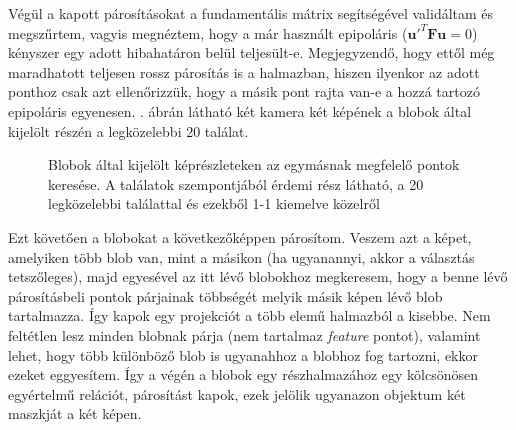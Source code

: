 Végül a kapott párosításokat a fundamentális mátrix segítségével validáltam és megszűrtem, vagyis megnéztem, hogy a már használt epipoláris ($\mathbf{u}'^T \mathbf{F} \mathbf{u} = 0$) kényszer egy adott hibahatáron belül teljesült-e. Megjegyzendő, hogy ettől még maradhatott teljesen rossz párosítás is a halmazban, hiszen ilyenkor az adott ponthoz csak azt ellenőrizzük, hogy a másik pont rajta van-e a hozzá tartozó epipoláris egyenesen. . ábrán látható két kamera két képének a blobok által kijelölt részén a legközelebbi 20 találat. 

\begin{figure}[tbh]
\centering


\caption{Blobok által kijelölt képrészleteken az egymásnak megfelelő pontok keresése. A találatok szempontjából érdemi rész látható, a 20 legközelebbi találattal és ezekből 1-1 kiemelve közelről \label{fig:multi-obj-matches}}
\end{figure}

Ezt követően a blobokat a következőképpen párosítom. Veszem azt a képet, amelyiken több blob van, mint a másikon (ha ugyanannyi, akkor a választás tetszőleges), majd egyesével az itt lévő blobokhoz megkeresem, hogy a benne lévő párosításbeli pontok párjainak többségét melyik másik képen lévő blob tartalmazza. Így kapok egy projekciót a több elemű halmazból a kisebbe. Nem feltétlen lesz minden blobnak párja (nem tartalmaz \textit{feature} pontot), valamint lehet, hogy több különböző blob is ugyanahhoz a blobhoz fog tartozni, ekkor ezeket eggyesítem. Így a végén a blobok egy részhalmazához egy kölcsönösen egyértelmű relációt, párosítást kapok, ezek jelölik ugyanazon objektum két maszkját a két képen. %

